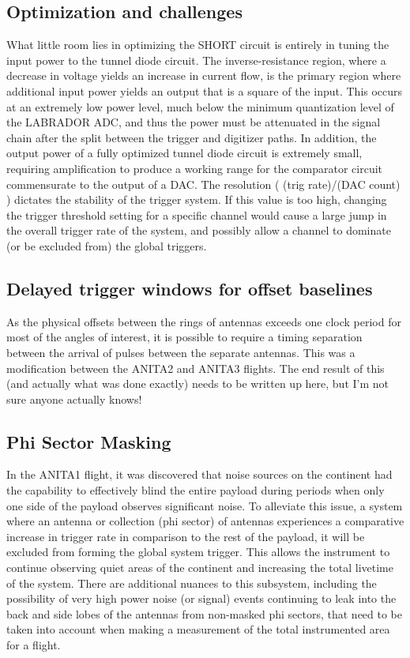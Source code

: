 	\subsection{Optimization and challenges}
		What little room lies in optimizing the SHORT circuit is entirely in tuning the input power to the tunnel diode circuit.  The inverse-resistance region, where a decrease in voltage yields an increase in current flow, is the primary region where additional input power yields an output that is a square of the input.  This occurs at an extremely low power level, much below the minimum quantization level of the LABRADOR ADC, and thus the power must be attenuated in the signal chain after the split between the trigger and digitizer paths.  In addition, the output power of a fully optimized tunnel diode circuit is extremely small,	requiring amplification to produce a working range for the comparator circuit commensurate to the output of a DAC.  The resolution ( (trig rate)/(DAC count) ) dictates the stability of the trigger system.  If this value is too high, changing the trigger threshold setting for a specific channel would cause a large jump in the overall trigger rate of the system, and possibly allow a channel to dominate (or be excluded from) the global triggers.
	\subsection{Delayed trigger windows for offset baselines}
		As the physical offsets between the rings of antennas exceeds one clock period for most of the angles of interest, it is possible to require a timing separation between the arrival of pulses between the separate antennas.  This was a modification between the ANITA2 and ANITA3 flights.  The end result of this (and actually what was done exactly) needs to be written up here, but I'm not sure anyone actually knows!
	\subsection{Phi Sector Masking}
		In the ANITA1 flight, it was discovered that noise sources on the continent had the capability to effectively blind the entire payload during periods when only one side of the payload observes significant noise.  To alleviate this issue, a system where an antenna or collection (phi sector) of antennas experiences a comparative increase in trigger rate in comparison to the rest of the payload, it will be excluded from forming the global system trigger.  This allows the instrument to continue observing quiet areas of the continent and increasing the total livetime of the system.  There are additional nuances to this subsystem, including the possibility of very high power noise (or signal) events continuing to leak into the back and side lobes of the antennas from non-masked phi sectors, that need to be taken into account when making a measurement of the total instrumented area for a flight.
		
